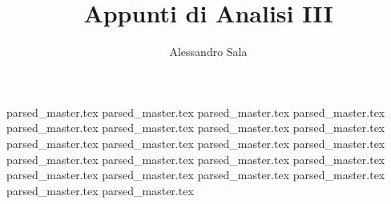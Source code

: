 \documentclass[a4paper]{article}
\begin{document}
\title{Appunti di Analisi III}
\author{Alessandro Sala}
\date{}
\maketitle
\newpage
\tableofcontents{}
\newpage
{parsed_master.tex}	
{parsed_master.tex}	
{parsed_master.tex}	
{parsed_master.tex}	
{parsed_master.tex}	
{parsed_master.tex}	
{parsed_master.tex}	
{parsed_master.tex}	
{parsed_master.tex}	
{parsed_master.tex}	
{parsed_master.tex}	
{parsed_master.tex}	
{parsed_master.tex}	
{parsed_master.tex}	
{parsed_master.tex}	
{parsed_master.tex}	
{parsed_master.tex}	
{parsed_master.tex}	
{parsed_master.tex}	
{parsed_master.tex}	
{parsed_master.tex}	
{parsed_master.tex}	
\end{document}
